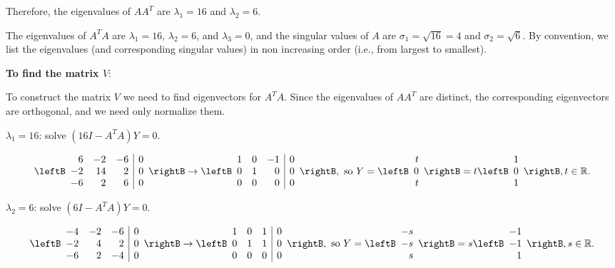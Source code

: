 \begin{solution}
Therefore, the eigenvalues of $AA^T$ are $\lambda_1=16$ and $\lambda_2=6$.

The eigenvalues of $A^TA$ are $\lambda_1=16$, $\lambda_2=6$, and
$\lambda_3=0$, and the singular values of $A$ are $\sigma_1=\sqrt{16}=4$ and
$\sigma_2=\sqrt{6}$.
By convention, we list the eigenvalues (and corresponding singular values)
in non increasing order (i.e., from largest to smallest).

{\bf To find the matrix $V$}:

To construct the matrix $V$ we need to find eigenvectors for $A^TA$.
Since the eigenvalues of $AA^T$ are distinct, the corresponding
eigenvectors are orthogonal, and we need only normalize them.

$\lambda_1=16$: solve $(16I-A^TA)Y= 0$.

\[ \leftB\begin{array}{rrr|r}
6 & -2 & -6 & 0 \\ -2 & 14 & 2 & 0 \\ -6 & 2 & 6 & 0
\end{array}\rightB
\rightarrow
\leftB\begin{array}{rrr|r}
1 & 0 & -1 & 0 \\ 0 & 1 & 0 & 0 \\ 0 & 0 & 0 & 0
\end{array}\rightB,
\mbox{ so }
Y=\leftB\begin{array}{r} t \\ 0 \\ t \end{array}\rightB
=t\leftB\begin{array}{r} 1 \\ 0 \\ 1 \end{array}\rightB,
t\in \mathbb{R}. \]

$\lambda_2=6$: solve $(6I-A^TA)Y= 0$.

\[ \leftB\begin{array}{rrr|r}
-4 & -2 & -6 & 0 \\ -2 & 4 & 2 & 0 \\ -6 & 2 & -4 & 0
\end{array}\rightB
\rightarrow
\leftB\begin{array}{rrr|r}
1 & 0 & 1 & 0 \\ 0 & 1 & 1 & 0 \\ 0 & 0 & 0 & 0
\end{array}\rightB,
\mbox{ so }
Y=\leftB\begin{array}{r} -s \\ -s \\ s \end{array}\rightB
=s\leftB\begin{array}{r} -1 \\ -1 \\ 1 \end{array}\rightB,
s\in \mathbb{R}. \]


\end{solution}
